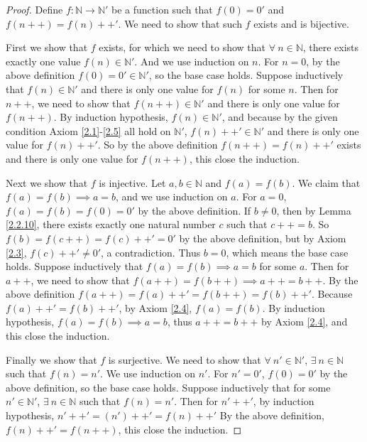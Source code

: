 \begin{proof}
Define \(f: \mathds{N} \to \mathds{N}'\) be a function such that \(f(0) = 0'\) and \(f(n++) = f(n)++'\).
We need to show that such \(f\) exists and is bijective.

First we show that \(f\) exists, for which we need to show that \(\forall\ n \in \mathds{N}\), there exists exactly one value \(f(n) \in \mathds{N}'\).
And we use induction on \(n\).
For \(n = 0\), by the above definition \(f(0) = 0' \in \mathds{N}'\), so the base case holds.
Suppose inductively that \(f(n) \in \mathds{N}'\) and there is only one value for \(f(n)\) for some \(n\).
Then for \(n++\), we need to show that \(f(n++) \in \mathds{N}'\) and there is only one value for \(f(n++)\).
By induction hypothesis, \(f(n) \in \mathds{N}'\), and because by the given condition Axiom \ref{2.1}-\ref{2.5} all hold on \(\mathds{N}'\), \(f(n)++' \in \mathds{N}'\) and there is only one value for \(f(n)++'\).
So by the above definition \(f(n++) = f(n)++'\) exists and there is only one value for \(f(n++)\), this close the induction.

Next we show that \(f\) is injective.
Let \(a, b \in \mathds{N}\) and \(f(a) = f(b)\).
We claim that \(f(a) = f(b) \implies a = b\), and we use induction on \(a\).
For \(a = 0\), \(f(a) = f(b) = f(0) = 0'\) by the above definition.
If \(b \neq 0\), then by Lemma \ref{2.2.10}, there exists exactly one natural number \(c\) such that \(c++ = b\).
So \(f(b) = f(c++) = f(c)++' = 0'\) by the above definition, but by Axiom \ref{2.3}, \(f(c)++' \neq 0'\), a contradiction.
Thus \(b = 0\), which means the base case holds.
Suppose inductively that \(f(a) = f(b) \implies a = b\) for some \(a\).
Then for \(a++\), we need to show that \(f(a++) = f(b++) \implies a++ = b++\).
By the above definition \(f(a++) = f(a)++' = f(b++) = f(b)++'\).
Because \(f(a)++' = f(b)++'\), by Axiom \ref{2.4}, \(f(a) = f(b)\).
By induction hypothesis, \(f(a) = f(b) \implies a = b\), thus \(a++ = b++\) by Axiom \ref{2.4}, and this close the induction.

Finally we show that \(f\) is surjective.
We need to show that \(\forall\ n' \in \mathds{N}'\), \(\exists\ n \in \mathds{N}\) such that \(f(n) = n'\).
We use induction on \(n'\).
For \(n' = 0'\), \(f(0) = 0'\) by the above definition, so the base case holds.
Suppose inductively that for some \(n' \in \mathds{N}'\), \(\exists\ n \in \mathds{N}\) such that \(f(n) = n'\).
Then for \(n'++'\), by induction hypothesis, \(n'++' = (n')++' = f(n)++'\)
By the above definition, \(f(n)++' = f(n++)\), this close the induction.
\end{proof}